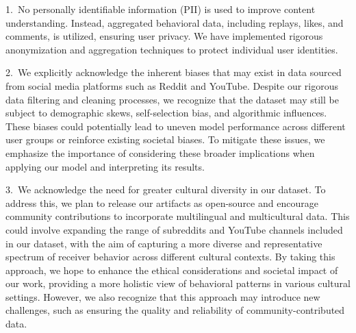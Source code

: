 1.~No personally identifiable information (PII) is used to improve content understanding. Instead, aggregated behavioral data, including replays, likes, and comments, is utilized, ensuring user privacy. We have implemented rigorous anonymization and aggregation techniques to protect individual user identities. 

2.~We explicitly acknowledge the inherent biases that may exist in data sourced from social media platforms such as Reddit and YouTube. Despite our rigorous data filtering and cleaning processes, we recognize that the dataset may still be subject to demographic skews, self-selection bias, and algorithmic influences. These biases could potentially lead to uneven model performance across different user groups or reinforce existing societal biases.
To mitigate these issues, we emphasize the importance of considering these broader implications when applying our model and interpreting its results. 


3.~We acknowledge the need for greater cultural diversity in our dataset. To address this, we plan to release our artifacts as open-source and encourage community contributions to incorporate multilingual and multicultural data. This could involve expanding the range of subreddits and YouTube channels included in our dataset, with the aim of capturing a more diverse and representative spectrum of receiver behavior across different cultural contexts.
By taking this approach, we hope to enhance the ethical considerations and societal impact of our work, providing a more holistic view of behavioral patterns in various cultural settings. However, we also recognize that this approach may introduce new challenges, such as ensuring the quality and reliability of community-contributed data.

